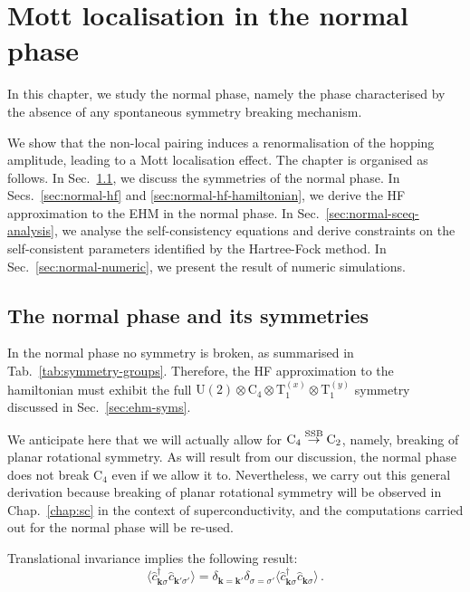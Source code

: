 \def\GraphicsFolder{chapters/normal-phase/pictures}
\chapter{Mott localisation in the normal phase}\label{chap:normal}

In this chapter, we study the normal phase, namely the phase characterised by the absence of any spontaneous symmetry breaking mechanism.

We show that the non-local pairing induces a renormalisation of the hopping amplitude, leading to a Mott localisation effect. The chapter is organised as follows. In Sec.~\ref{sec:normal-phase-theory}, we discuss the symmetries of the normal phase. In Secs.~\ref{sec:normal-hf} and \ref{sec:normal-hf-hamiltonian}, we derive the HF approximation to the EHM in the normal phase. In Sec.~\ref{sec:normal-sceq-analysis}, we analyse the self-consistency equations and derive constraints on the self-consistent parameters identified by the Hartree-Fock method. In Sec.~\ref{sec:normal-numeric}, we present the result of numeric simulations.

\section{The normal phase and its  symmetries}\label{sec:normal-phase-theory}

In the normal phase no symmetry is broken, as summarised in Tab.~\ref{tab:symmetry-groups}. Therefore, the HF approximation to the hamiltonian must exhibit the full $\mathrm{U}(2) \otimes \mathrm{C}_4 \otimes \mathrm{T}_1^{(x)} \otimes \mathrm{T}_1^{(y)}$ symmetry discussed in Sec.~\ref{sec:ehm-syms}.

We anticipate here that we will actually allow for $\mathrm{C}_4 \stackrel{\mathrm{SSB}}{\to} \mathrm{C}_2$, namely, breaking of planar rotational symmetry. As will result from our discussion, the normal phase does not break $\mathrm{C}_4$ even if we allow it to. Nevertheless, we carry out this general derivation because breaking of planar rotational symmetry will be observed in Chap.~\ref{chap:sc} in the context of superconductivity, and the computations carried out for the normal phase will be re-used.
 
Translational invariance implies the following result:
\begin{equation}\label{eq:normal-<cc>}
	\langle \hat c_{\mathbf{k}\sigma}^\dagger \hat c_{\mathbf{k}'\sigma'} \rangle = \delta_{\mathbf{k}=\mathbf{k}'} \delta_{\sigma=\sigma'} \langle \hat c_{\mathbf{k}\sigma}^\dagger \hat c_{\mathbf{k}\sigma} \rangle \, .
\end{equation}

